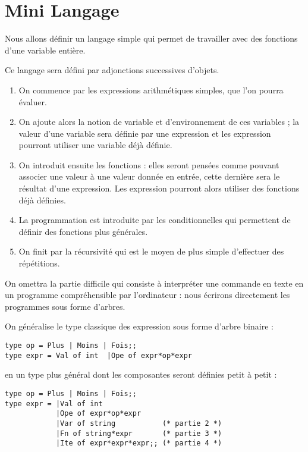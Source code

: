 \def\V{\text{\sc Vrai}\,}
\def\F{\text{\sc Faux}\,}
\def\ite{\text{\sc ite}\,}
\chapter{Mini Langage}
\thispagestyle{empty}
Nous allons définir un langage simple qui permet de travailler avec des fonctions d'une variable entière. 

Ce langage sera défini par adjonctions successives d'objets.

\begin{enumerate}
  \item On commence par les expressions arithmétiques simples, que l'on pourra évaluer.
  \item On ajoute alors la notion de variable et d'environnement de ces variables ; la valeur d'une variable sera définie par une expression et les expression pourront utiliser une variable déjà définie.
  \item On introduit ensuite les fonctions : elles seront pensées comme pouvant associer une valeur à une valeur donnée en entrée, cette dernière sera le résultat d'une expression. Les expression pourront alors utiliser des fonctions déjà définies.
  \item La programmation est introduite par les conditionnelles  qui permettent de définir des fonctions plus générales.
  \item On finit par la récursivité qui est le moyen de plus simple d'effectuer des répétitions.
\end{enumerate}

On omettra la partie difficile qui consiste à interpréter une commande en texte en un programme compréhensible par l'ordinateur : nous écrirons directement les programmes sous forme d'arbres. 

On généralise le type classique des expression sous forme d'arbre binaire :
\begin{lstlisting}
type op = Plus | Moins | Fois;;
type expr = Val of int  |Ope of expr*op*expr
\end{lstlisting}
en un type plus général dont les composantes seront définies petit à petit :
\begin{lstlisting}
type op = Plus | Moins | Fois;;
type expr = |Val of int  
            |Ope of expr*op*expr
            |Var of string           (* partie 2 *)
            |Fn of string*expr       (* partie 3 *)
            |Ite of expr*expr*expr;; (* partie 4 *)
\end{lstlisting}

